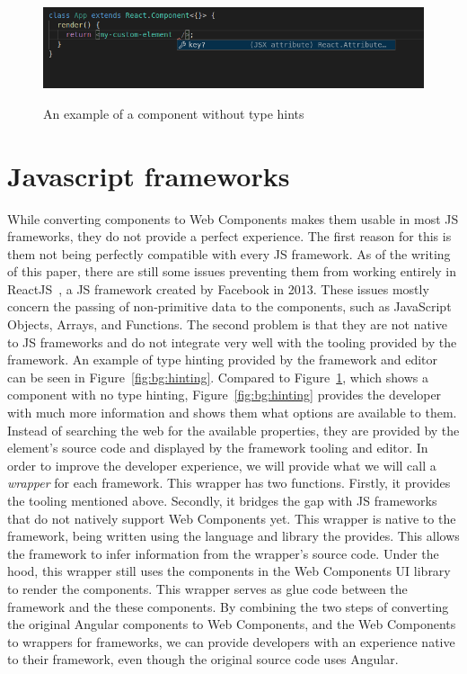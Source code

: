 \begin{figure}[h]
  \caption{An example of a component without type hints}
  \includegraphics[width=\columnwidth]{figures/background/no-hinting.png}
  \label{fig:bg:no-hinting}
  \centering
\end{figure}

\section{Javascript frameworks}\label{sec:bg:jsframeworks}
While converting components to Web Components makes them usable in most JS frameworks, they do not provide a perfect experience. The first reason for this is them not being perfectly compatible with every JS framework. As of the writing of this paper, there are still some issues preventing them from working entirely in ReactJS~, a JS framework created by Facebook in 2013. These issues mostly concern the passing of non-primitive data to the components, such as JavaScript Objects, Arrays, and Functions. The second problem is that they are not native to JS frameworks and do not integrate very well with the tooling provided by the framework. An example of type hinting provided by the framework and editor can be seen in Figure~\ref{fig:bg:hinting}. Compared to Figure~\ref{fig:bg:no-hinting}, which shows a component with no type hinting, Figure~\ref{fig:bg:hinting} provides the developer with much more information and shows them what options are available to them. Instead of searching the web for the available properties, they are provided by the element's source code and displayed by the framework tooling and editor. In order to improve the developer experience, we will provide what we will call a \emph{wrapper} for each framework. This wrapper has two functions. Firstly, it provides the tooling mentioned above. Secondly, it bridges the gap with JS frameworks that do not natively support Web Components yet. This wrapper is native to the framework, being written using the language and library the provides. This allows the framework to infer information from the wrapper's source code. Under the hood, this wrapper still uses the components in the Web Components UI library to render the components. This wrapper serves as glue code between the framework and the these components. By combining the two steps of converting the original Angular components to Web Components, and the Web Components to wrappers for frameworks, we can provide developers with an experience native to their framework, even though the original source code uses Angular.